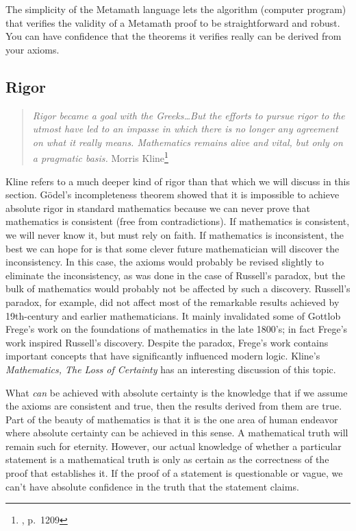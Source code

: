 The simplicity of the Metamath language lets the algorithm (computer program)
that verifies the validity of a Metamath proof to be straightforward and
robust.  You can have confidence that the theorems it verifies really can be
derived from your axioms.

\subsection{Rigor}

\begin{quote}
  {\em Rigor became a goal with the Greeks\ldots But the efforts to
  pursue rigor to the utmost have led to an impasse in which there is
  no longer any agreement on what it really means.  Mathematics remains
  alive and vital, but only on a pragmatic basis.}
    \flushright\sc  Morris Kline\footnote{\cite{Kline}, p.~1209}\\
\end{quote}

Kline refers to a much deeper kind of rigor than that which we will discuss in
this section.  G\"{o}del's incompleteness theorem showed that it is impossible to achieve absolute rigor
in standard mathematics because we can never prove that mathematics is
consistent (free from contradictions).  If
mathematics is consistent, we will never know it, but must rely on faith.  If
mathematics is inconsistent, the best we can hope for is that some clever
future mathematician will discover the inconsistency.  In this case, the
axioms would probably be revised slightly to eliminate the inconsistency, as
was done in the case of Russell's paradox, but the
bulk of mathematics would probably not be affected by such a discovery.
Russell's paradox, for example, did not affect most of the remarkable results
achieved by 19th-century and earlier mathematicians.  It mainly invalidated
some of Gottlob Frege's work on the foundations of
mathematics in the late 1800's; in fact Frege's work inspired Russell's
discovery.  Despite the paradox, Frege's work contains important concepts that
have significantly influenced modern logic.  Kline's {\em Mathematics, The
Loss of Certainty} \cite{Klinel} has an interesting
discussion of this topic.

What {\em can} be achieved with absolute certainty is the
knowledge that if we assume the axioms are consistent and true, then the
results derived from them are true.  Part of the beauty of mathematics is that
it is the one area of human endeavor where absolute certainty can be achieved
in this sense.  A mathematical truth will remain such for eternity.  However,
our actual knowledge of whether a particular statement is a mathematical truth
is only as certain as the correctness of the proof that establishes it.  If
the proof of a statement is questionable or vague, we can't have absolute
confidence in the truth that the statement claims.

